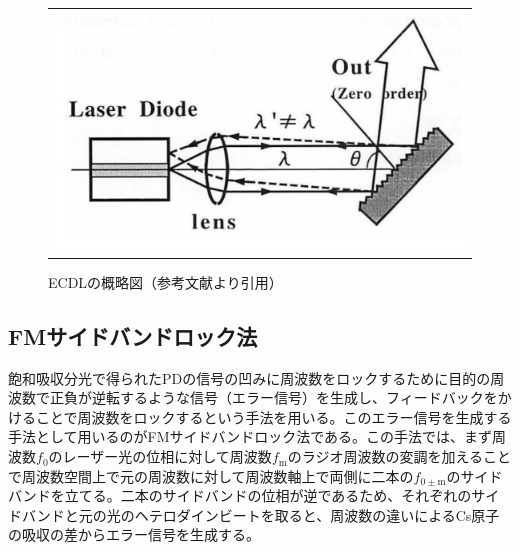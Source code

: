 \documentclass[uplatex, dvipdfmx, a4paper, report, papersize, 11pt]{jsbook}
\begin{document}
\begin{figure}[htpb]
  \centering
    \begin{tabular}{c}
      \begin{minipage}{1\hsize}
        \centering
          \includegraphics[keepaspectratio,  scale=0.35,  angle=0]
                          {figures/saturated-absorption/ECDL_diagram.png}
                          \caption{ECDLの概略図（参考文献\cite{ECDL}より引用）}
                          \label{ECDL_diagram}
      \end{minipage}
    \end{tabular}
\end{figure}
\subsection{FMサイドバンドロック法}
飽和吸収分光で得られたPDの信号の凹みに周波数をロックするために目的の周波数で正負が逆転するような信号（エラー信号）を生成し、フィードバックをかけることで周波数をロックするという手法を用いる。このエラー信号を生成する手法として用いるのがFMサイドバンドロック法である。この手法では、まず周波数$f_\mathrm{0}$のレーザー光の位相に対して周波数$f_\mathrm{m}$のラジオ周波数の変調を加えることで周波数空間上で元の周波数に対して周波数軸上で両側に二本の$f_\mathrm{0\pm m}$のサイドバンドを立てる。二本のサイドバンドの位相が逆であるため、それぞれのサイドバンドと元の光のヘテロダインビートを取ると、周波数の違いによるCs原子の吸収の差からエラー信号を生成する。
\end{document}
